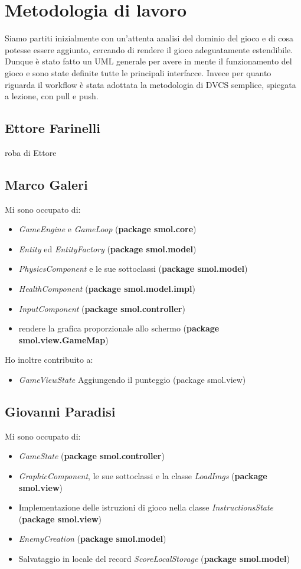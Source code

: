 \documentclass[a4paper,12pt]{report}
\begin{document}
\section{Metodologia di lavoro}

Siamo partiti inizialmente con un'attenta analisi del dominio del gioco e di cosa potesse essere aggiunto, cercando di rendere il gioco adeguatamente estendibile.
Dunque è stato fatto un UML generale per avere in mente il funzionamento del gioco e sono state definite tutte le principali interfacce.
Invece per quanto riguarda il workflow è stata adottata la metodologia di DVCS semplice, spiegata a lezione, con pull e push.

\subsection*{Ettore Farinelli}
roba di Ettore
\subsection*{Marco Galeri}

Mi sono occupato di:
\begin{itemize}
    \item \emph{GameEngine} e \emph{GameLoop} (\textbf{package smol.core})
    \item \emph{Entity} ed \emph{EntityFactory} (\textbf{package smol.model})
    \item \emph{PhysicsComponent} e le sue sottoclassi (\textbf{package smol.model})
    \item \emph{HealthComponent} (\textbf{package smol.model.impl})
    \item \emph{InputComponent} (\textbf{package smol.controller})
    \item rendere la grafica proporzionale allo schermo (\textbf{package smol.view.GameMap})
\end{itemize}

Ho inoltre contribuito a:
\begin{itemize}
    \item \emph{GameViewState} Aggiungendo il punteggio (package smol.view)
\end{itemize}

\subsection*{Giovanni Paradisi}

Mi sono occupato di:
\begin{itemize}
    \item \emph{GameState} (\textbf{package smol.controller})
    \item \emph{GraphicComponent}, le sue sottoclassi e la classe \emph{LoadImgs} (\textbf{package smol.view})
    \item Implementazione delle istruzioni di gioco nella classe \emph{InstructionsState} (\textbf{package smol.view})
    \item \emph{EnemyCreation} (\textbf{package smol.model})
    \item Salvataggio in locale del record \emph{ScoreLocalStorage} (\textbf{package smol.model})
\end{itemize}
\end{document}
